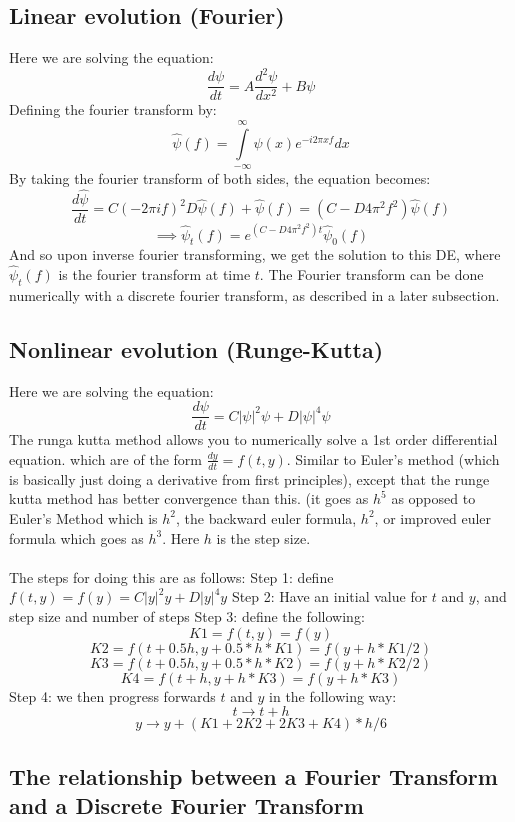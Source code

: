 \documentclass[a4paper,12pt]{report}
\begin{document}
\subsection{Linear evolution (Fourier)}
Here we are solving the equation: 
$$\frac{d\psi}{dt}=A\frac{d^2\psi}{dx^2}+B\psi$$
Defining the fourier transform by: 
$$\hat \psi(f)=\int\limits_{-\infty}^\infty \psi(x)e^{-i2\pi x f} dx$$
By taking the fourier transform of both sides, the equation becomes:\\
$$\frac{d \hat \psi}{dt}= C(-2\pi i f)^2 D\hat \psi (f)+\hat \psi(f)= (C-D4 \pi^2 f^2) \hat \psi(f)$$
$$\implies \hat \psi_t(f) = e^{(C-D4\pi^2 f^2)t}\hat \psi_0(f)$$
And so upon inverse fourier transforming, we get the solution to this DE, where $\hat \psi_t(f)$ is the fourier transform at time $t$.
The Fourier transform can be done numerically with a discrete fourier transform, as described in a later subsection.

\subsection{Nonlinear evolution (Runge-Kutta)}
Here we are solving the equation:
$$\frac{d\psi}{dt}=C|\psi|^2\psi + D|\psi|^4\psi$$
The runga kutta method allows you to numerically solve a 1st order differential equation. which are of the form $\frac{dy}{dt}=f(t,y)$. Similar to Euler's method (which is basically just doing a derivative from first principles), except that the runge kutta method has better convergence than this. (it goes as $h^5$ as opposed to Euler's Method which is $h^2$, the backward euler formula, $h^2$, or improved euler formula which goes as $h^3$. Here $h$ is the step size. 
\\\\
The steps for doing this are as follows:
Step 1: define $f(t,y)=f(y)=C|y|^2 y  +D|y|^4 y$
Step 2: Have an initial value for $t$ and $y$, and step size and number of steps
Step 3: define the following:
$$K1 =f(t,y)=f(y)$$
$$K2 =f(t+0.5h,y+0.5*h*K1)=f(y+h*K1/2)$$
$$K3 =f(t+0.5h,y+0.5*h*K2)=f(y+h*K2/2)$$
$$K4 =f(t+h,y+h*K3)=f(y+h*K3)$$
Step 4: we then progress forwards $t$ and $y$ in the following way:
$$t\rightarrow t+h$$
$$y\rightarrow y+(K1+2K2+2K3+K4)*h/6$$


\subsection{The relationship between a Fourier Transform and a Discrete Fourier Transform}
\end{document}
